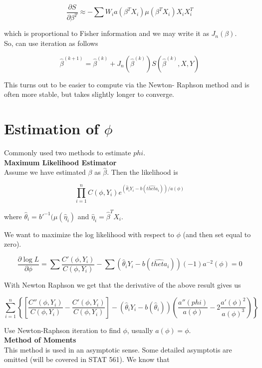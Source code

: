 \documentclass[11pt,fleqn]{book} %
\begin{document}
		$$\frac{\partial S}{\partial \beta^T} \approx - \sum W_i a(\beta^T X_i)\mu(\beta^TX_i) X_i X_i^T $$

which is proportional to Fisher information and we may write it as $J_n(\beta)$.\\

So, can use iteration as follows

		$$\hat{\beta}^{(k+1)} = \hat{\beta}^{(k)} + J_n(\hat{\beta}^{(k)}) S(\hat{\beta}^{(k)}, X, Y) $$

This turns out to be easier to compute via the Newton- Raphson method and is often more stable, but takes slightly longer to converge. 

\section{Estimation of $\phi$}

Commonly used two methods to estimate $phi$. \\

\textbf{Maximum Likelihood Estimator}\\

Assume we have estimated $\beta$ as $\hat{\beta}$. Then the likelihood is

		$$\prod^n_{i=1} C(\phi, Y_i) e^{(\hat{\theta}_i Y_i - b(\hat{theta}_i))/a(\phi)} $$

where $\hat{\theta}_i = b'^{-1}(\mu(\hat{\eta}_i)$ and $\hat{\eta}_i = \hat{\beta}^T X_i$.


We want to maximize the log likelihood with respect to $\phi$  (and then set equal to zero). 

		$$\frac{\partial \log L}{\partial \phi} = \sum \frac{C'(\phi, Y_i)}{C(\phi, Y_i)} - \sum (\hat{\theta}_i Y_i - b(\hat{theta}_i))(-1)a^{-2}(\phi) = 0$$


With Newton Raphson we get that the derivative of the above result gives us

		$$\sum^n_{i=1} \left\{ \left[\frac{C''(\phi, Y_i)}{C(\phi, Y_i)} - \frac{C'(\phi, Y_i)}{C(\phi, Y_i)} \right] - (\hat{\theta}_i Y_i - b(\hat{\theta}_i)) \left(\frac{a''(phi)}{a(\phi)} - 2\frac{a'(\phi)^2}{a(\phi)^3} \right) \right\} $$

	Use Newton-Raphson iteration to find $\phi$, usually $a(\phi)= \phi$.\\

\textbf{Method of Moments}\\

This method is used in an asymptotic sense. Some detailed asymptotis are omitted (will be covered in STAT 561). We know that 
\end{document}
